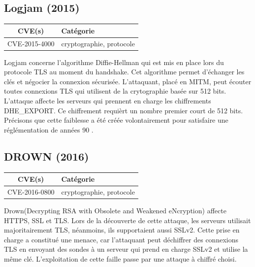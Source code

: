 

\subsection{Logjam (2015)}

\begin{tabularx}{0.96\textwidth}{|c|X|}
  \hline
  \textbf{CVE(s)} & \textbf{Catégorie} \\
  \hline
  CVE-2015-4000 & cryptographie, protocole \\
  \hline
\end{tabularx}

\vspace{1em}

Logjam concerne l'algorithme Diffie-Hellman qui est mis en place lors du protocole TLS au moment du handshake. Cet algorithme permet d'échanger les clés et négocier la connexion sécurisée. L'attaquant, placé en MITM, peut écouter toutes connexions TLS qui utilisent de la crytographie basée sur 512 bits. L'attaque affecte les serveurs qui prennent en charge les chiffrements DHE\_EXPORT. Ce chiffrement requièrt un nombre premier court de 512 bits. Précisons que cette faiblesse a été créée volontairement pour satisfaire une réglémentation de années 90
\cite{logjam}.




\subsection{DROWN (2016)}

\begin{tabularx}{0.96\textwidth}{|c|X|}
  \hline
  \textbf{CVE(s)} & \textbf{Catégorie} \\
  \hline
  CVE-2016-0800 & cryptographie, protocole \\
  \hline
\end{tabularx}

\vspace{1em}

Drown(Decrypting RSA with Obsolete and Weakened eNcryption) affecte HTTPS, SSL et TLS. Lors de la découverte de cette attaque, les serveurs utilisait majoritairement TLS, néanmoins, ils supportaient aussi SSLv2. Cette prise en charge a constitué une menace, car l'attaquant peut déchiffrer des connexions TLS en envoyant des sondes à un serveur qui prend en charge SSLv2 et utilise la même clé. L'exploitation de cette faille passe par une attaque à chiffré choisi\cite{drown}.


